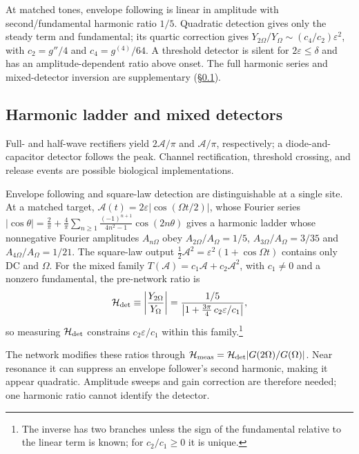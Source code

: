 \documentclass[11pt,a4paper]{article}
\newif\ifjne
\newcommand{\half}{\tfrac{1}{2}}
\providecommand{\DIFaddtex}[1]{{\protect\color{blue} \sf #1}} %
\providecommand{\DIFaddbegin}{} %
\providecommand{\DIFaddend}{} %
\providecommand{\DIFadd}[1]{\texorpdfstring{\DIFaddtex{#1}}{#1}} %
\begin{document}
At matched tones, envelope following is linear in amplitude with
second/fundamental harmonic ratio $1/5$. Quadratic detection gives only
the steady term and fundamental; its quartic correction gives
$Y_{2\Omega}/Y_\Omega\sim(c_4/c_2)\varepsilon^2$, with
$c_2=g''/4$ and $c_4=g^{(4)}/64$. A threshold detector is silent for
$2\varepsilon\le\delta$ and has an amplitude-dependent ratio above onset.
The full harmonic series and mixed-detector inversion are supplementary
(\S\ref{supp:harmonics}).
\ifjne\else
\subsection{Harmonic ladder and mixed detectors}\label{supp:harmonics}
\DIFaddbegin \DIFadd{Full- and half-wave rectifiers yield $2\mathcal A/\pi$ and
$\mathcal A/\pi$, respectively; a diode-and-capacitor detector follows the
peak. Channel rectification, threshold crossing, and release events are
possible biological implementations.
}

\DIFaddend Envelope following and square-law detection are distinguishable at a single site. At a matched target,
$\mathcal A(t)=2\varepsilon|\cos(\Omega t/2)|$, whose Fourier series
$|\cos\theta|=\tfrac2\pi+\tfrac4\pi\sum_{n\ge1}\tfrac{(-1)^{n+1}}{4n^2-1}\cos(2n\theta)$ gives a
harmonic ladder whose nonnegative Fourier amplitudes $A_{n\Omega}$ obey $A_{2\Omega}/A_\Omega=1/5$, $A_{3\Omega}/A_\Omega=3/35$ and
$A_{4\Omega}/A_\Omega=1/21$. The square-law output $\half \mathcal A^2=\varepsilon^2(1+\cos\Omega
t)$ contains only DC and $\Omega$. For the mixed family $T(\mathcal A)=c_1\mathcal A+c_2\mathcal A^2$, with
$c_1\ne0$ and a nonzero fundamental, the
pre-network ratio is
\begin{equation}
\mathcal H_{\rm det}\equiv\left|\frac{Y_{2\Omega}}{Y_\Omega}\right|
=\frac{1/5}{\left|1+\tfrac{3\pi}{4}\,c_2\varepsilon/c_1\right|},
\label{eq:rdet}
\end{equation}
so measuring $\mathcal H_{\rm det}$ constrains $c_2\varepsilon/c_1$ within this family.\footnote{The inverse has two branches unless the sign of the fundamental
relative to the linear term is known; for $c_2/c_1\ge0$ it is unique.}

\fi

The network modifies these ratios through
$\mathcal H_{\rm meas}=\mathcal H_{\rm det}|G(2\Omega)/G(\Omega)|$.
Near resonance it can suppress an envelope follower's second harmonic,
making it appear quadratic. Amplitude sweeps and gain correction are
therefore needed; one harmonic ratio cannot identify the detector.
\end{document}
